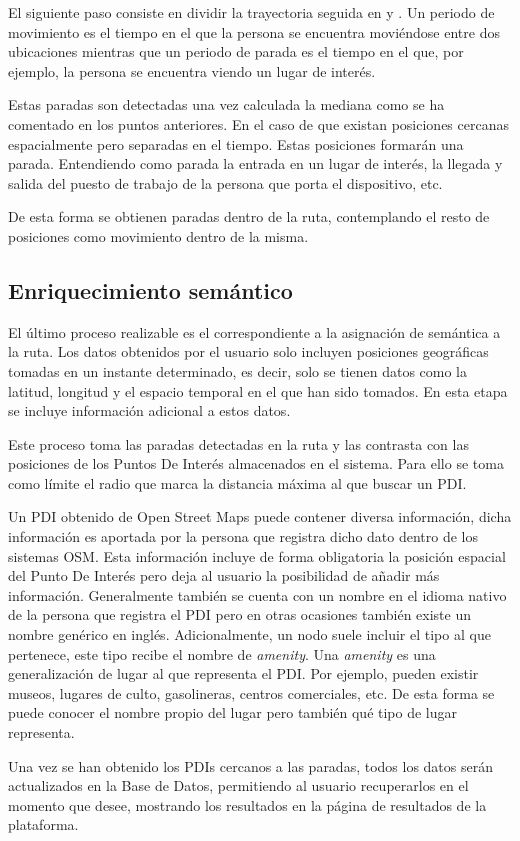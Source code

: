 El siguiente paso consiste en dividir la trayectoria seguida en  y . Un periodo de movimiento es el tiempo en el que la persona se encuentra moviéndose entre dos ubicaciones mientras que un periodo de parada es el tiempo en el que, por ejemplo, la persona se encuentra viendo un lugar de interés.

Estas paradas son detectadas una vez calculada la mediana como se ha comentado en los puntos anteriores. En el caso de que existan posiciones cercanas espacialmente pero separadas en el tiempo. Estas posiciones formarán una parada. Entendiendo como parada la entrada en un lugar de interés, la llegada y salida del puesto de trabajo de la persona que porta el dispositivo, etc.

De esta forma se obtienen paradas dentro de la ruta, contemplando el resto de posiciones como movimiento dentro de la misma.

\subsection{Enriquecimiento semántico}

El último proceso realizable es el correspondiente a la asignación de semántica a la ruta. Los datos obtenidos por el usuario solo incluyen posiciones geográficas tomadas en un instante determinado, es decir, solo se tienen datos como la latitud, longitud y el espacio temporal en el que han sido tomados. En esta etapa se incluye información adicional a estos datos.

Este proceso toma las paradas detectadas en la ruta y las contrasta con las posiciones de los Puntos De Interés almacenados en el sistema. Para ello se toma como límite el radio que marca la distancia máxima al que buscar un PDI.

Un PDI obtenido de Open Street Maps puede contener diversa información, dicha información es aportada por la persona que registra dicho dato dentro de los sistemas OSM. Esta información incluye de forma obligatoria la posición espacial del Punto De Interés pero deja al usuario la posibilidad de añadir más información. Generalmente también se cuenta con un nombre en el idioma nativo de la persona que registra el PDI pero en otras ocasiones también existe un nombre genérico en inglés. Adicionalmente, un nodo suele incluir el tipo al que pertenece, este tipo recibe el nombre de \textit{amenity}. Una \textit{amenity} es una generalización de lugar al que representa el PDI. Por ejemplo, pueden existir museos, lugares de culto, gasolineras, centros comerciales, etc. De esta forma se puede conocer el nombre propio del lugar pero también qué tipo de lugar representa.

Una vez se han obtenido los PDIs cercanos a las paradas, todos los datos serán actualizados en la Base de Datos, permitiendo al usuario recuperarlos en el momento  que desee, mostrando los resultados en la página de resultados de la plataforma.
